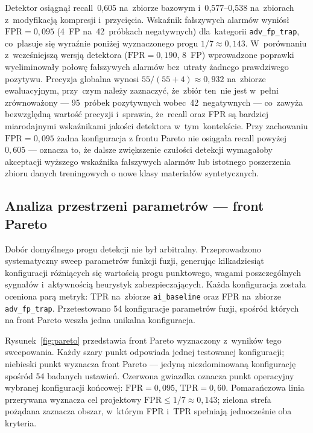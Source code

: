 Detektor osiągnął recall~0{,}605 na~zbiorze bazowym
i~0{,}577--0{,}538 na~zbiorach z~modyfikacją kompresji i~przycięcia.
Wskaźnik fałszywych alarmów wyniósł $\mathrm{FPR} = 0{,}095$
(4~FP na~42~próbkach negatywnych) dla~kategorii \texttt{adv\_fp\_trap},
co~plasuje się wyraźnie poniżej wyznaczonego progu $1/7 \approx 0{,}143$.
W~porównaniu z~wcześniejszą wersją detektora ($\mathrm{FPR} = 0{,}190$, 8~FP)
wprowadzone poprawki wyeliminowały połowę fałszywych alarmów
bez~utraty żadnego prawdziwego pozytywu.
Precyzja globalna wynosi $55/(55+4) \approx 0{,}932$ na~zbiorze ewaluacyjnym,
przy~czym należy zaznaczyć, że~zbiór ten~nie jest w~pełni zrównoważony
--- 95~próbek pozytywnych wobec~42~negatywnych --- co~zawyża bezwzględną
wartość precyzji i~sprawia, że~recall oraz FPR są bardziej miarodajnymi
wskaźnikami jakości detektora w~tym~kontekście. Przy zachowaniu $\text{FPR} = 0{,}095$ żadna konfiguracja z frontu Pareto nie osiągała
recall powyżej $0{,}605$ --- oznacza to, że dalsze zwiększenie czułości detekcji wymagałoby
akceptacji wyższego wskaźnika fałszywych alarmów lub istotnego poszerzenia zbioru danych
treningowych o nowe klasy materiałów syntetycznych.

\subsection*{Analiza przestrzeni parametrów --- front Pareto}

Dobór domyślnego progu detekcji nie był arbitralny. Przeprowadzono
systematyczny sweep parametrów funkcji fuzji, generując kilkadziesiąt
konfiguracji różniących się wartością progu punktowego, wagami
poszczególnych sygnałów i~aktywnością heurystyk zabezpieczających.
Każda konfiguracja została oceniona parą metryk: TPR na~zbiorze
\texttt{ai\_baseline} oraz FPR na~zbiorze \texttt{adv\_fp\_trap}.
Przetestowano 54 konfiguracje parametrów fuzji, spośród których na front Pareto weszła jedna unikalna konfiguracja.

Rysunek~\ref{fig:pareto} przedstawia front Pareto wyznaczony z~wyników
tego sweepowania. Każdy szary punkt odpowiada jednej testowanej konfiguracji;
niebieski punkt wyznacza front Pareto — jedyną niezdominowaną konfigurację
spośród 54 badanych ustawień. Czerwona gwiazdka oznacza punkt operacyjny
wybranej konfiguracji końcowej: $\mathrm{FPR} = 0{,}095$, $\mathrm{TPR} = 0{,}60$.
Pomarańczowa linia przerywana wyznacza cel projektowy
$\mathrm{FPR} \leq 1/7 \approx 0{,}143$; zielona strefa pożądana
zaznacza obszar, w~którym FPR i~TPR spełniają jednocześnie oba kryteria.

